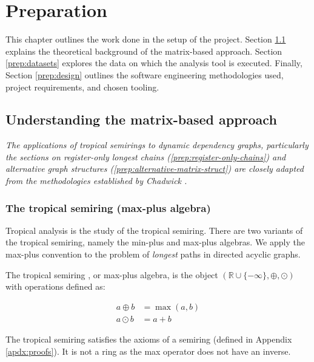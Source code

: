 \chapter{Preparation}

This chapter outlines the work done in the setup of the project. Section \ref{prep:understanding-approach}
explains the theoretical background of the matrix-based approach. Section \ref{prep:datasets} 
explores the data on which the analysis tool is executed. Finally, Section \ref{prep:design}
outlines the software engineering methodologies used, project requirements, and chosen tooling.

\section{Understanding the matrix-based approach} \label{prep:understanding-approach}

{\footnotesize\itshape
The applications of tropical semirings to dynamic dependency graphs, particularly the sections on
register-only longest chains (\ref{prep:register-only-chains})
and alternative graph structures (\ref{prep:alternative-matrix-struct})
are closely adapted from the methodologies established by Chadwick \cite{Chadderz}.}

\subsection{The tropical semiring (max-plus algebra)}

Tropical analysis is the study of the tropical semiring.
There are two variants of the tropical semiring, namely the min-plus and max-plus algebras.
We apply the max-plus convention to the problem of \textit{longest} paths in directed acyclic graphs.

 

\begin{definition}
  The tropical semiring \cite{Wandsnider2020}, or max-plus algebra, is the object $(\mathbb{R} \cup \{-\infty\}, \oplus, \odot)$ with operations 
defined as:

$$
\begin{aligned}
  a\oplus b &= \max(a,b) \\
  a\odot b &= a+b
\end{aligned}
$$

The tropical semiring satisfies the axioms of a semiring (defined in Appendix \ref{apdx:proofs}).
It is not a ring as the max operator does not have an inverse.

\end{definition}

